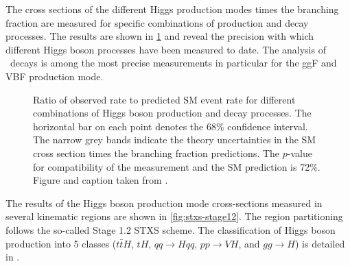 The cross sections of the different Higgs production modes times the branching fraction are measured for specific combinations of production and decay processes. 
The results are shown in \cref{fig:prod-per-channel} and reveal the precision with which different Higgs boson processes have been measured to date. 
The analysis of \HWW\ decays is among the most precise measurements in particular for the ggF and VBF production mode.
\begin{figure}
  \caption{Ratio of observed rate to predicted SM event rate for different combinations of
  Higgs boson production and decay processes. The horizontal bar on each point denotes the 68\% confidence interval. The narrow grey bands indicate the theory uncertainties in the SM cross section times the branching
fraction predictions. The $p$-value for compatibility of the measurement and the SM prediction is
72\%. Figure and caption taken from .}
  \label{fig:prod-per-channel}
\end{figure}
The results of the Higgs boson production mode cross-sections measured in several kinematic regions are shown in \cref{fig:stxs-stage12}. The region partitioning follows the so-called Stage 1.2 STXS scheme. 
The classification of Higgs boson production into 5 classes ($t\bar{t}H$, $tH$, $qq\to Hqq$, $pp\to VH$, and $gg\to H$) is detailed in \cite{NaturePaper}. 
